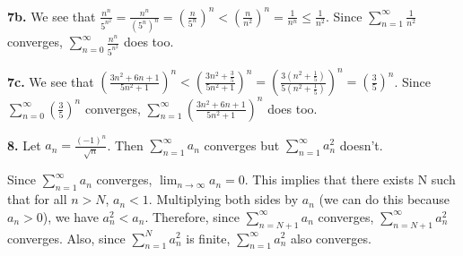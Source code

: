 \documentclass{article}
\begin{document}
\textbf{7b.} We see that $\frac{n^n}{5^{n^2}} = \frac{n^n}{(5^n)^n} = \left(\frac{n}{5^n}\right)^n < \left(\frac{n}{n^2}\right)^n = \frac{1}{n^n} \le \frac{1}{n^2}$. Since $\sum_{n = 1}^\infty \frac{1}{n^2}$ converges, $\sum_{n = 0}^\infty\frac{n^n}{5^{n^2}}$ does too.
\newline

\textbf{7c.} We see that $\left(\frac{3n^2 + 6n + 1}{5n^2 + 1}\right)^n < \left(\frac{3n^2 + \frac{3}{5}}{5n^2 + 1}\right)^n = \left(\frac{3\left(n^2 + \frac{1}{5}\right)}{5\left(n^2 + \frac{1}{5}\right)}\right)^n = \left(\frac{3}{5}\right)^n$. Since $\sum_{n = 0}^\infty \left(\frac{3}{5}\right)^n$ converges, $\sum_{n = 1}^\infty \left(\frac{3n^2 + 6n + 1}{5n^2 + 1}\right)^n$ does too.
\newline

\textbf{8.} Let $a_n = \frac{(-1)^n}{\sqrt{n}}$. Then $\sum_{n = 1}^\infty a_n$ converges but $\sum_{n = 1}^\infty a_n^2$ doesn't.
\newline

Since $\sum_{n = 1}^\infty a_n$ converges, $\lim_{n \to \infty} a_n = 0$. This implies that there exists N such that for all $n > N$, $a_n < 1$. Multiplying both sides by $a_n$ (we can do this because $a_n > 0$), we have $a_n^2 < a_n$. Therefore, since $\sum_{n = N + 1}^\infty a_n$ converges, $\sum_{n = N + 1}^\infty a_n^2$ converges. Also, since $\sum_{n = 1}^N a_n^2$ is finite, $\sum_{n = 1}^\infty a_n^2$ also converges.
\end{document}
